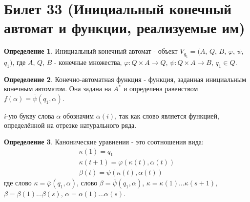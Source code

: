 \documentclass[a4paper, 12pt]{article}
\renewcommand{\phi}{\varphi}
\theoremstyle{definition}
\newtheorem*{definition}{Определение}
\theoremstyle{plain}
\theoremstyle{remark}
\begin{document}
  \section{Билет 33 (Инициальный конечный автомат и функции, реализуемые им)}
  \begin{definition}
    Инициальный конечный автомат - объект $V_{q_1}=(A$, $Q$, $B$, $\phi$, $\psi$, $q_1)$, где $A$, $Q$, $B$ - конечные множества, $\phi :Q\times A\rightarrow Q$, $\psi : Q\times A \rightarrow B$, $q_1\in Q$.
  \end{definition}
  \begin{definition}
    Конечно-автоматная функция - функция, заданная инициальным конечным автоматом. Она задана на $A^*$ и определена равенством $f(\alpha)=\overline{\psi}(q_1,\alpha)$.
  \end{definition}
  $i$-ую букву слова $\alpha$ обозначим $\alpha(i)$, так как слово является функцией, определённой на отрезке натурального ряда.
  \begin{definition}
    Канонические уравнения - это соотношения вида:
    $$\begin{matrix}
      \kappa(1)=q_1\\
      \kappa(t+1)=\phi(\kappa(t), \alpha(t))\\
      \beta(t)=\psi(\kappa(t), \alpha(t))
    \end{matrix}$$
    где слово $\kappa=\overline{\phi}(q_1, \alpha)$, слово $\beta=\overline{\psi}(q_1,\alpha)$, $\kappa=\kappa(1)\ldots\kappa(s+1)$, $\beta=\beta(1)\ldots\beta(s)$, $\alpha=\alpha(1)\ldots\alpha(s)$.
  \end{definition}
\end{document}
